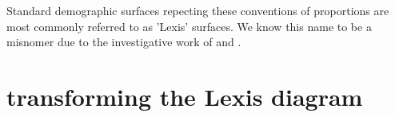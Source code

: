 \documentclass[a4paper]{article}
\begin{document}
Standard demographic surfaces repecting these conventions of proportions are most commonly referred to as 'Lexis' surfaces. We know this name to be a misnomer due to the investigative work of \citet{vandeschrick2001lexis} and \citet{keiding2011age}. 

\section{transforming the Lexis diagram}


\nocite{*} %

   

 
\end{document}
